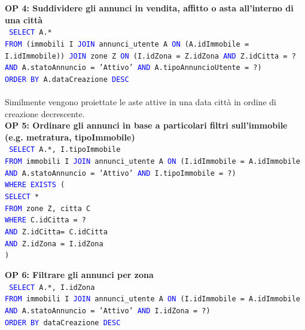 \documentclass[a4paper,12pt]{report}
\begin{document}
            \noindent
            \textbf{OP 4: Suddividere gli annunci in vendita, affitto o asta all’interno di una città} \\
            \texttt{
                \textcolor{blue}{SELECT} A.* \\
                \textcolor{blue}{FROM} (immobili I \textcolor{blue}{JOIN} annunci\_utente A \textcolor{blue}{ON} (A.idImmobile = I.idImmobile)) \textcolor{blue}{JOIN} zone Z \textcolor{blue}{ON} (I.idZona = Z.idZona \textcolor{blue}{AND} Z.idCitta = ? \textcolor{blue}{AND} A.statoAnnuncio = 'Attivo' \textcolor{blue}{AND} A.tipoAnnuncioUtente = ?) \\
                \textcolor{blue}{ORDER BY} A.dataCreazione  \textcolor{blue}{DESC} \\
            }
            \\
            Similmente vengono proiettate le aste attive in una data città in ordine di creazione decrescente.\\

            \noindent
            \textbf{OP 5: Ordinare gli annunci in base a particolari filtri sull'immobile (e.g. metratura, tipoImmobile)} \\
            \texttt{
                \textcolor{blue}{SELECT} A.*, I.tipoImmobile \\
                \textcolor{blue}{FROM} immobili I \textcolor{blue}{JOIN} annunci\_utente A \textcolor{blue}{ON} (I.idImmobile = A.idImmobile \textcolor{blue}{AND} A.statoAnnuncio = 'Attivo' \textcolor{blue}{AND} I.tipoImmobile = ?) \\
                \textcolor{blue}{WHERE} \textcolor{blue}{EXISTS} ( \\
                    \null\qquad \textcolor{blue}{SELECT} * \\
                    \null\qquad \textcolor{blue}{FROM} zone Z, citta C \\
                    \null\qquad \textcolor{blue}{WHERE} C.idCitta = ? \\
                    \null\qquad \textcolor{blue}{AND} Z.idCitta= C.idCitta \\
                    \null\qquad \textcolor{blue}{AND} Z.idZona = I.idZona\\
                    ) \\
            }

            \noindent
            \textbf{OP 6: Filtrare gli annunci per zona} \\
            \texttt{
                \textcolor{blue}{SELECT} A.*, I.idZona \\
                \textcolor{blue}{FROM} immobili I \textcolor{blue}{JOIN} annunci\_utente A \textcolor{blue}{ON} (I.idImmobile = A.idImmobile \\
                \textcolor{blue}{AND} A.statoAnnuncio = 'Attivo' \textcolor{blue}{AND} I.idZona = ?) \\
                \textcolor{blue}{ORDER BY} dataCreazione   \textcolor{blue}{DESC} \\
            }
\end{document}
